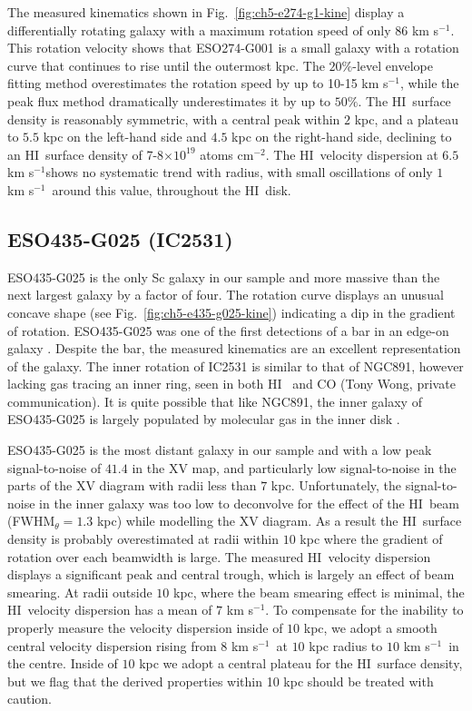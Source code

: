 \documentclass[traditabstract]{aa} %
\newcommand\HI{H{\small I}}
\newcommand\kms{km s$^{-1}$}
\newcommand\atomscmsq{atoms cm$^{-2}$}
\begin{document}
The measured kinematics shown in Fig.~\ref{fig:ch5-e274-g1-kine}
display a differentially rotating galaxy with a maximum rotation
speed of only $86$ \kms.  This rotation velocity shows that
ESO274-G001 is a small galaxy with a rotation curve
that continues to rise until the outermost kpc. The $20\%$-level envelope fitting method
overestimates the rotation speed by up to 10-15 \kms, while the peak
flux method dramatically underestimates it by up to
$50\%$.  The \HI\ surface density is reasonably symmetric,
with a central peak within $2$ kpc, and a plateau to $5.5$ kpc
on the left-hand side and $4.5$ kpc on the right-hand side, declining 
to an \HI\
surface density of 7-8$\times 10^{19}$ \atomscmsq. The \HI\ velocity
dispersion at $6.5$ \kms shows no systematic trend with radius, with small
oscillations of only $1$ \kms\ around this value, throughout the \HI\ disk.


\subsection{ESO435-G025 (IC2531)}

ESO435-G025 is the only Sc galaxy in our sample and more massive
than the next largest galaxy by a factor of four. The rotation curve displays an
unusual concave shape (see
Fig.~\ref{fig:ch5-e435-g025-kine}) indicating a dip in the gradient of rotation. 
ESO435-G025 was one of the first detections of a bar in an 
edge-on galaxy \citep{bf1999}. 
Despite the bar,  the
measured kinematics are an excellent representation of the galaxy. The
inner rotation of IC2531 is similar to that of NGC891, however lacking
gas tracing an inner ring, seen in both \HI\ \citep{ssvdh1997} and CO (Tony
Wong, private communication). It is quite possible that
like NGC891, the inner galaxy of ESO435-G025 is largely populated
by molecular gas in the inner disk \citep{wbvdh2004}.

ESO435-G025 is the most distant galaxy in our sample and with a low
peak signal-to-noise of $41.4$ in the XV map, and particularly low
signal-to-noise in the parts of the XV diagram with radii less than
$7$ kpc. Unfortunately, the signal-to-noise in the inner galaxy was
too low to deconvolve for the effect of the \HI\ beam
(FWHM$_{\theta}=1.3$ kpc) while modelling the XV diagram. As a result 
the \HI\
surface density is probably overestimated at radii within $10$ kpc
where the gradient of rotation over each beamwidth
is large. The measured \HI\ velocity dispersion displays a significant peak
and central trough, which is largely an effect of beam smearing.
At radii outside $10$ kpc, where the beam smearing effect is minimal, 
the \HI\ velocity dispersion has a
mean of $7$ \kms. To compensate for the inability to properly measure
the velocity dispersion inside of $10$ kpc, we adopt a smooth central
velocity dispersion rising from $8$ \kms\ at $10$ kpc radius to $10$
\kms\ in the centre. Inside of $10$ kpc we adopt a
central plateau for the \HI\ surface density, but we flag that the derived
properties within 10 kpc should be treated with caution.
\end{document}
